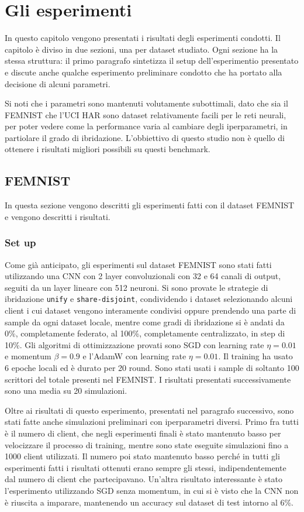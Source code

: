 \chapter{Gli esperimenti}
In questo capitolo vengono presentati i risultati degli esperimenti 
condotti. Il capitolo è diviso in due sezioni, una per dataset studiato.
Ogni sezione ha la stessa struttura: il primo paragrafo sintetizza il 
setup dell'esperimentio presentato e discute anche qualche esperimento
preliminare condotto che ha portato alla decisione di alcuni parametri.

Si noti che i parametri sono mantenuti volutamente subottimali, dato 
che sia il FEMNIST che l'UCI HAR sono dataset relativamente facili
per le reti neurali, per poter vedere come la performance varia al 
cambiare degli iperparametri, in partiolare il grado di ibridazione.
L'obbiettivo di questo studio non è quello di ottenere i risultati 
migliori possibili su questi benchmark.

\section{FEMNIST}
In questa sezione vengono descritti gli esperimenti fatti con il dataset
FEMNIST e vengono descritti i risultati.

\subsection{Set up}
Come già anticipato, gli esperimenti sul dataset FEMNIST sono stati fatti 
utilizzando una CNN con 2 layer convoluzionali con 32 e 64 canali di 
output, seguiti da un layer lineare con 512 neuroni. Si sono provate le 
strategie di ibridazione \texttt{unify} e \texttt{share-disjoint},
condividendo i dataset selezionando alcuni client i cui dataset 
vengono interamente condivisi oppure prendendo una parte di sample da 
ogni dataset locale, mentre come gradi di ibridazione si è andati da 0\%,
completamente federato, al 100\%, completamente centralizzato,
in step di 10\%. Gli algoritmi di ottimizzazione provati sono SGD 
con learning rate \(\eta = 0.01\) e momentum \(\beta = 0.9\) e l'AdamW
con learning rate \(\eta = 0.01\). Il training ha usato 6 epoche locali
ed è durato per 20 round. Sono stati usati i sample di soltanto 100 
scrittori del totale presenti nel FEMNIST. I risultati presentati 
successivamente sono una media su 20 simulazioni.

Oltre ai risultati di questo esperimento, presentati nel paragrafo
successivo, sono stati fatte anche simulazioni preliminari con 
iperparametri diversi. Primo fra tutti è il numero di client, che negli 
esperimenti finali è stato mantenuto basso per velocizzare il processo 
di training, mentre sono state eseguite simulazioni fino a 1000 client 
utilizzati. Il numero poi stato mantenuto basso perché in tutti gli 
esperimenti fatti i risultati ottenuti erano sempre gli stessi, 
indipendentemente dal numero di client che partecipavano.
Un'altra risultato interessante è stato l'esperimento utilizzando SGD
senza momentum, in cui si è visto che la CNN non è riuscita a imparare,
mantenendo un accuracy sul dataset di test intorno al 6\%.

